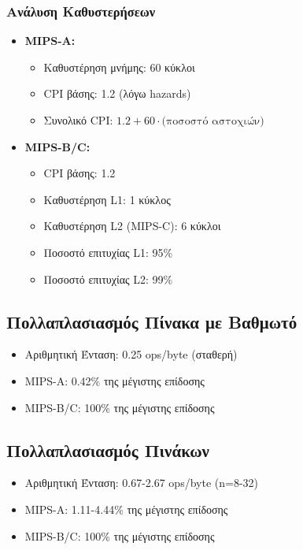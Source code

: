 \documentclass[11pt,a4paper]{article}
\begin{document}
\subsubsection{Ανάλυση Καθυστερήσεων}
\begin{itemize}
    \item \textbf{MIPS-A:}
    \begin{itemize}
        \item Καθυστέρηση μνήμης: 60 κύκλοι
        \item CPI βάσης: 1.2 (λόγω hazards)
        \item Συνολικό CPI: $1.2 + 60 \cdot \text{(ποσοστό αστοχιών)}$
    \end{itemize}

    \item \textbf{MIPS-B/C:}
    \begin{itemize}
        \item CPI βάσης: 1.2
        \item Καθυστέρηση L1: 1 κύκλος
        \item Καθυστέρηση L2 (MIPS-C): 6 κύκλοι
        \item Ποσοστό επιτυχίας L1: 95\%
        \item Ποσοστό επιτυχίας L2: 99\%
    \end{itemize}
\end{itemize}

\subsection{Πολλαπλασιασμός Πίνακα με Βαθμωτό}
\begin{itemize}
    \item Αριθμητική Ένταση: 0.25 ops/byte (σταθερή)
    \item MIPS-A: 0.42\% της μέγιστης επίδοσης
    \item MIPS-B/C: 100\% της μέγιστης επίδοσης
\end{itemize}

\subsection{Πολλαπλασιασμός Πινάκων}
\begin{itemize}
    \item Αριθμητική Ένταση: 0.67-2.67 ops/byte (n=8-32)
    \item MIPS-A: 1.11-4.44\% της μέγιστης επίδοσης
    \item MIPS-B/C: 100\% της μέγιστης επίδοσης
\end{itemize}
\end{document}
